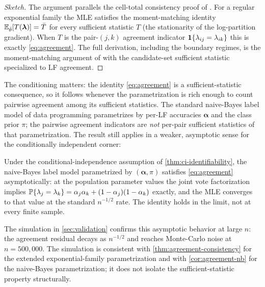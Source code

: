 \begin{proof}[Sketch]
The argument parallels the cell-total consistency proof of
\citet[\S 3]{towell2026scrnacoarsening}. For a regular exponential
family the MLE satisfies the moment-matching identity
$\mathbb{E}_{\hat\theta}[T(\bm{\lambda})] = \bar{T}$ for every sufficient
statistic $T$ (the stationarity of the log-partition gradient). When
$T$ is the pair-$(j,k)$ agreement indicator
$\mathbf{1}\{\lambda_{ij} = \lambda_{ik}\}$ this is exactly
\eqref{eq:agreement}. The full derivation, including the boundary
regimes, is the moment-matching argument of
\citet{towell2026scrnacoarsening} with the candidate-set sufficient
statistic specialized to LF agreement.
\end{proof}

The conditioning matters: the identity \eqref{eq:agreement} is a
sufficient-statistic consequence, so it follows whenever the
parametrization is rich enough to count pairwise agreement among its
sufficient statistics. The standard naive-Bayes label model of data
programming \citep{ratner2016data} parametrizes by per-LF accuracies
$\bm{\alpha}$ and the class prior $\pi$; the pairwise agreement
indicators are \emph{not} per-pair sufficient statistics of that
parametrization. The result still applies in a weaker, asymptotic
sense for the conditionally independent corner:

\begin{corollary}
\label{cor:agreement-nb}
Under the conditional-independence assumption of
\cref{thm:ci-identifiability}, the naive-Bayes label model
parametrized by $(\bm{\alpha}, \pi)$ satisfies
\eqref{eq:agreement} asymptotically: at the population
parameter values the joint vote factorization implies $\mathbb{P}\{
\lambda_j = \lambda_k\} = \alpha_j \alpha_k + (1-\alpha_j)(1-\alpha_k)$
exactly, and the MLE converges to that value at the standard
$n^{-1/2}$ rate. The identity holds in the limit, not at every finite
sample.
\end{corollary}

The simulation in \cref{sec:validation} confirms this asymptotic
behavior at large $n$: the agreement residual decays as $n^{-1/2}$
and reaches Monte-Carlo noise at $n = 500{,}000$. The simulation is
consistent with \cref{thm:agreement-consistency} for the extended
exponential-family parametrization and with \cref{cor:agreement-nb}
for the naive-Bayes parametrization; it does not isolate the
sufficient-statistic property structurally.


